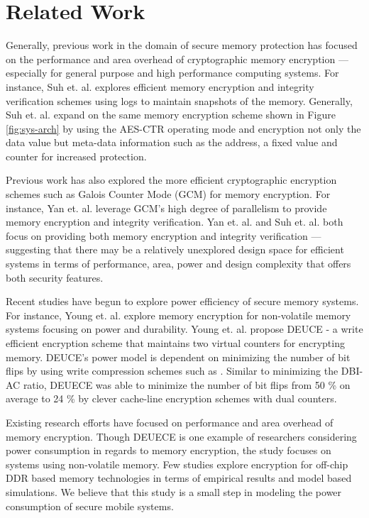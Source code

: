 \section{Related Work}
\label{sec-related}

Generally, previous work in the domain of secure memory protection has focused
on the performance and area overhead of cryptographic memory encryption ---
especially for general purpose and high performance computing systems. For
instance, Suh et. al. \cite{suh-memIntEnc} explores efficient memory encryption
and integrity verification schemes using logs to maintain snapshots of the
memory. Generally, Suh et. al. \cite{suh-memIntEnc} expand on the same memory
encryption scheme shown in Figure \ref{fig:sys-arch} by using the AES-CTR
operating mode and encryption not only the data value but meta-data information
such as the address, a fixed value and counter for increased protection.

Previous work has also explored the more efficient cryptographic encryption
schemes such as Galois Counter Mode (GCM) \cite{nistGCM} for memory encryption.
For instance, Yan et. al. \cite{gcmMem} leverage GCM's high degree of
parallelism to provide memory encryption and integrity verification. Yan et.
al. and Suh et. al. both focus on providing both memory encryption and
integrity verification --- suggesting that there may be a relatively unexplored
design space for efficient systems in terms of performance, area, power and
design complexity that offers both security features.

Recent studies have begun to explore power efficiency of secure memory systems.
For instance, Young et. al. \cite{duece} explore memory encryption for
non-volatile memory systems focusing on power and durability. Young et. al.
propose DEUCE - a write efficient encryption scheme that maintains two virtual
counters for encrypting memory. DEUCE's power model is dependent on minimizing
the number of bit flips by using write compression schemes such as
 \cite{fnw}. Similar to minimizing the DBI-AC ratio, DEUECE
was able to minimize the number of bit flips from 50 \% on average to 24 \% by
clever cache-line encryption schemes with dual counters.

Existing research efforts have focused on performance and area overhead of
memory encryption. Though DEUECE is one example of researchers considering
power consumption in regards to memory encryption, the study focuses on systems
using non-volatile memory. Few studies explore encryption for off-chip DDR
based memory technologies in terms of empirical results and model based
simulations. We believe that this study is a small step in modeling the power
consumption of secure mobile systems.
